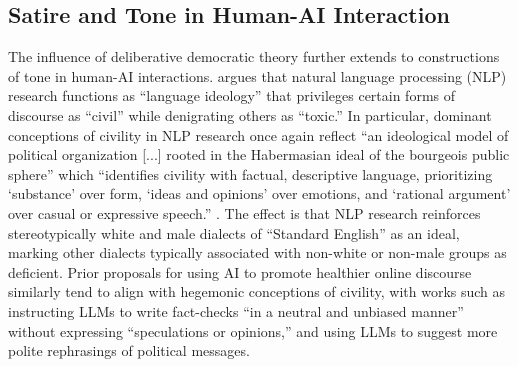 

\subsection{Satire and Tone in Human-AI Interaction}\label{sec:satire-ai}
The influence of deliberative democratic theory further extends to constructions of tone in human-AI interactions. \citet{Chronis2026NLPAsLanguageIdeology} argues that natural language processing (NLP) research functions as ``language ideology'' that privileges certain forms of discourse as ``civil'' while denigrating others as ``toxic.'' In particular, dominant conceptions of civility in NLP research once again reflect ``an ideological model of political organization [...] rooted in the Habermasian ideal of the bourgeois public sphere'' which ``identifies civility with factual, descriptive language, prioritizing `substance' over form, `ideas and opinions' over emotions, and `rational argument' over casual or expressive speech.'' \cite{Chronis2026NLPAsLanguageIdeology}. The effect is that NLP research reinforces stereotypically white and male dialects of ``Standard English'' as an ideal, marking other dialects typically associated with non-white or non-male groups as deficient. Prior proposals for using AI to promote healthier online discourse similarly tend to align with hegemonic conceptions of civility, with works such as \citet{Deetal2024Supernotes} instructing LLMs to write fact-checks ``in a neutral and unbiased manner'' without expressing ``speculations or opinions,'' and \citet{Argyleetal2023LeveragingAI} using LLMs to suggest more polite rephrasings of political messages.

